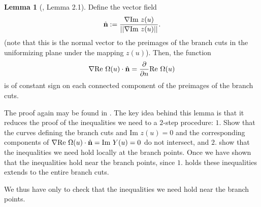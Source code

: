 \documentclass[usenames,dvipsnames]{article}
\theoremstyle{definition}
\newtheorem{lemma}{Lemma}[section]
\numberwithin{equation}{section}
\numberwithin{figure}{section}
\begin{document}
\begin{lemma}[\cite{DHL1}, Lemma 2.1]\label{global-inequalities}
    Define the vector field
    \begin{equation}
        \hat{{\bf n}} := \frac{\nabla \text{Im }z(u)}{||\nabla \text{Im }z(u)||}.
    \end{equation} 
(note that this is the normal vector to the preimages of the branch cuts in the uniformizing plane under the mapping $z(u)$).
    Then, the function
        \begin{equation}
            \nabla \text{Re }\Omega(u) \cdot \hat{{\bf n}} = \frac{\partial}{\partial n} \text{Re }\Omega(u)
        \end{equation}
    is of constant sign on each connected component of the preimages of the branch cuts.
\end{lemma}
The proof again may be found in \cite{DHL1}. The key idea behind this lemma is that it reduces the proof of the inequalities we need to a $2$-step procedure: $1.$ Show that the curves defining the branch cuts and $\text{Im } z(u) = 0$ and the corresponding components of
$\nabla \text{Re }\Omega(u) \cdot \hat{{\bf n}} = \text{Im } Y(u) = 0$ do not intersect, and $2.$ show that the inequalities we need hold locally at the branch points. Once we have shown that the inequalities hold near the branch points, since $1.$ holds these
inequalities extends to the entire branch cuts.

We thus have only to check that the inequalities we need hold near the branch points. 
\end{document}
